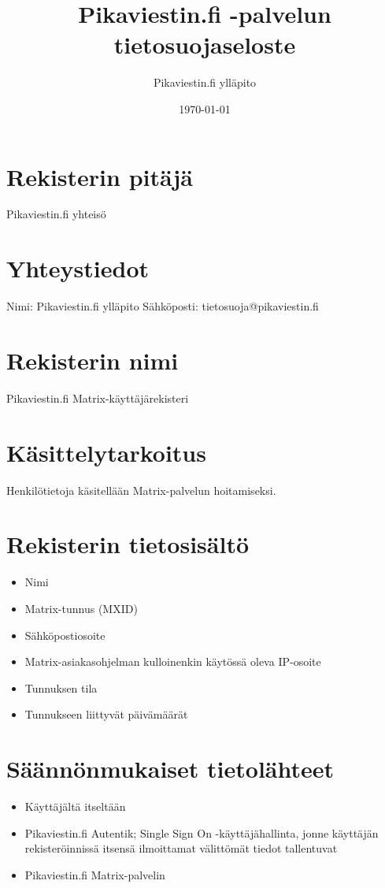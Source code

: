 \documentclass[a4paper]{vakioasiakirja}
\author{Pikaviestin.fi ylläpito}
\date{\today}
\title{Pikaviestin.fi -palvelun tietosuojaseloste}
\begin{document}
\maketitle

\section{Rekisterin pitäjä}\align Pikaviestin.fi yhteisö

\section{Yhteystiedot}\align
Nimi: Pikaviestin.fi ylläpito
Sähköposti: tietosuoja@pikaviestin.fi

\section{Rekisterin nimi}\align
Pikaviestin.fi Matrix-käyttäjärekisteri

\section{Käsittelytarkoitus}\align
Henkilötietoja käsitellään Matrix-palvelun hoitamiseksi.

\section{Rekisterin tietosisältö}\align

\begin{itemize}
\item{Nimi}
\item{Matrix-tunnus (MXID)}
\item{Sähköpostiosoite}
\item{Matrix-asiakasohjelman kulloinenkin käytössä oleva IP-osoite}
\item{Tunnuksen tila}
\item{Tunnukseen liittyvät päivämäärät}
\end{itemize}



\section{Säännönmukaiset tietolähteet}\align
\begin{itemize}
\item{Käyttäjältä itseltään}
\item{Pikaviestin.fi Autentik; Single Sign On -käyttäjähallinta, jonne käyttäjän rekisteröinnissä itsensä ilmoittamat välittömät tiedot tallentuvat}
\item{Pikaviestin.fi Matrix-palvelin}
\end{itemize}
\end{document}
